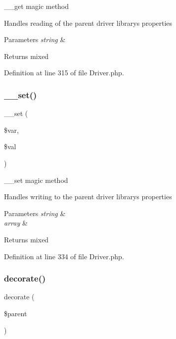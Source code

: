 \+\_\+\+\_\+get magic method

Handles reading of the parent driver library\textquotesingle{}s properties


\begin{DoxyParams}{Parameters}
{\em string} & \\
\hline
\end{DoxyParams}
\begin{DoxyReturn}{Returns}
mixed 
\end{DoxyReturn}


Definition at line 315 of file Driver.\+php.

\mbox{\label{class_c_i___driver_a921783e9d7c3fb79479375193c9f3d1e}} 
\subsubsection{\texorpdfstring{\_\_set()}{\_\_set()}}
{\footnotesize\ttfamily \+\_\+\+\_\+set (\begin{DoxyParamCaption}\item[{}]{\$var,  }\item[{}]{\$val }\end{DoxyParamCaption})}

\+\_\+\+\_\+set magic method

Handles writing to the parent driver library\textquotesingle{}s properties


\begin{DoxyParams}{Parameters}
{\em string} & \\
\hline
{\em array} & \\
\hline
\end{DoxyParams}
\begin{DoxyReturn}{Returns}
mixed 
\end{DoxyReturn}


Definition at line 334 of file Driver.\+php.

\mbox{\label{class_c_i___driver_acf6a5ad6a84d4c7a27f463cbb618004b}} 
\subsubsection{\texorpdfstring{decorate()}{decorate()}}
{\footnotesize\ttfamily decorate (\begin{DoxyParamCaption}\item[{}]{\$parent }\end{DoxyParamCaption})}

